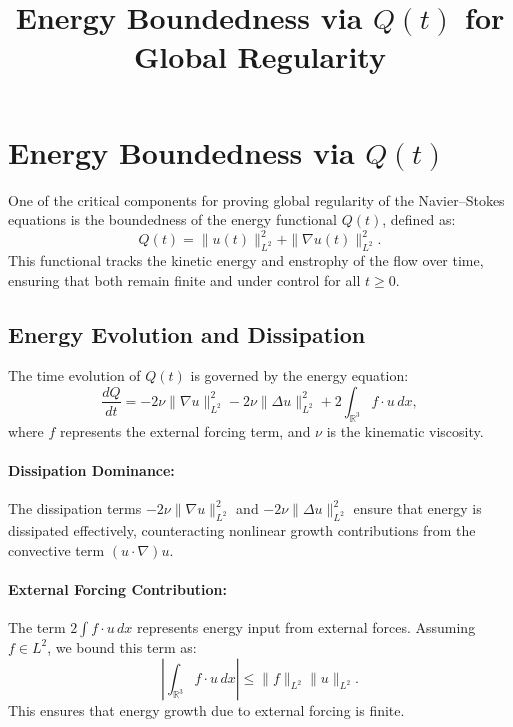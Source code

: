 \documentclass[12pt]{article}
\theoremstyle{definition}
\begin{document}
\title{Energy Boundedness via $Q(t)$ for Global Regularity}
\author{}
\date{}
\maketitle

\section{Energy Boundedness via $Q(t)$}

One of the critical components for proving global regularity of the Navier--Stokes equations is the boundedness of the energy functional $Q(t)$, defined as:
\begin{equation}
Q(t) = \|u(t)\|_{L^2}^2 + \|\nabla u(t)\|_{L^2}^2.
\label{eq:qt_definition}
\end{equation}
This functional tracks the kinetic energy and enstrophy of the flow over time, ensuring that both remain finite and under control for all $t \geq 0$.

\subsection{Energy Evolution and Dissipation}
The time evolution of $Q(t)$ is governed by the energy equation:
\begin{equation}
\frac{dQ}{dt} = -2\nu \|\nabla u\|_{L^2}^2 - 2\nu \|\Delta u\|_{L^2}^2 + 2 \int_{\mathbb{R}^3} f \cdot u \, dx,
\label{eq:energy_evolution}
\end{equation}
where $f$ represents the external forcing term, and $\nu$ is the kinematic viscosity.

\paragraph{Dissipation Dominance:}
The dissipation terms $-2\nu \|\nabla u\|_{L^2}^2$ and $-2\nu \|\Delta u\|_{L^2}^2$ ensure that energy is dissipated effectively, counteracting nonlinear growth contributions from the convective term $(u \cdot \nabla)u$.

\paragraph{External Forcing Contribution:}
The term $2 \int f \cdot u \, dx$ represents energy input from external forces. Assuming $f \in L^2$, we bound this term as:
\begin{equation}
\left| \int_{\mathbb{R}^3} f \cdot u \, dx \right| \leq \|f\|_{L^2} \|u\|_{L^2}.
\end{equation}
This ensures that energy growth due to external forcing is finite.
\end{document}

